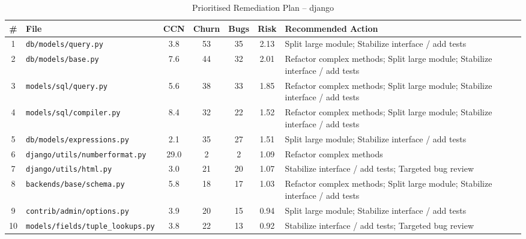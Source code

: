 \begin{table}[H]
\centering
\footnotesize
\caption{Prioritised Remediation Plan -- django}
\label{tab:remediation_django}
\begin{tabular}{c l c c c c p{4.2cm}}
\toprule
\# & File & CCN & Churn & Bugs & Risk & Recommended Action \\
\midrule
  1 & \texttt{db/models/query.py} & 3.8 & 53 & 35 & 2.13 & Split large module; Stabilize interface / add tests \\
  2 & \texttt{db/models/base.py} & 7.6 & 44 & 32 & 2.01 & Refactor complex methods; Split large module; Stabilize interface / add tests \\
  3 & \texttt{models/sql/query.py} & 5.6 & 38 & 33 & 1.85 & Refactor complex methods; Split large module; Stabilize interface / add tests \\
  4 & \texttt{models/sql/compiler.py} & 8.4 & 32 & 22 & 1.52 & Refactor complex methods; Split large module; Stabilize interface / add tests \\
  5 & \texttt{db/models/expressions.py} & 2.1 & 35 & 27 & 1.51 & Split large module; Stabilize interface / add tests \\
  6 & \texttt{django/utils/numberformat.py} & 29.0 & 2 & 2 & 1.09 & Refactor complex methods \\
  7 & \texttt{django/utils/html.py} & 3.0 & 21 & 20 & 1.07 & Stabilize interface / add tests; Targeted bug review \\
  8 & \texttt{backends/base/schema.py} & 5.8 & 18 & 17 & 1.03 & Refactor complex methods; Split large module; Stabilize interface / add tests \\
  9 & \texttt{contrib/admin/options.py} & 3.9 & 20 & 15 & 0.94 & Split large module; Stabilize interface / add tests \\
  10 & \texttt{models/fields/tuple\_lookups.py} & 3.8 & 22 & 13 & 0.92 & Stabilize interface / add tests; Targeted bug review \\
\bottomrule
\end{tabular}
\end{table}
